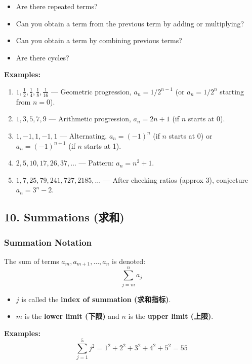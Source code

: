 \documentclass[10pt,a4paper,openany]{ctexbook}
\theoremstyle{definition}
\theoremstyle{remark}
\begin{document}
\begin{itemize}
\item Are there repeated terms?
\item Can you obtain a term from the previous term by adding or multiplying?
\item Can you obtain a term by combining previous terms?
\item Are there cycles?

\end{itemize}

\textbf{Examples:}
\begin{enumerate}
\item $1, \frac{1}{2}, \frac{1}{4}, \frac{1}{8}, \frac{1}{16}$ — Geometric progression, $a_n = 1/2^{n-1}$ (or $a_n = 1/2^n$ starting from $n=0$).
\item $1, 3, 5, 7, 9$ — Arithmetic progression, $a_n = 2n + 1$ (if $n$ starts at 0).
\item $1, -1, 1, -1, 1$ — Alternating, $a_n = (-1)^n$ (if $n$ starts at 0) or $a_n = (-1)^{n+1}$ (if $n$ starts at 1).
\item $2, 5, 10, 17, 26, 37, \dots$ — Pattern: $a_n = n^2 + 1$.
\item $1, 7, 25, 79, 241, 727, 2185, \dots$ — After checking ratios (approx 3), conjecture $a_n = 3^n - 2$.

\end{enumerate}

\vspace{-2pt}

\subsection{10. Summations (求和)}

\subsubsection{Summation Notation}

The sum of terms $a_m, a_{m+1}, \dots, a_n$ is denoted:
\[
\sum_{j=m}^{n} a_j
\]

\begin{itemize}
\item $j$ is called the \textbf{index of summation (求和指标)}.
\item $m$ is the \textbf{lower limit (下限)} and $n$ is the \textbf{upper limit (上限)}.

\end{itemize}

\textbf{Examples:}
\[
\sum_{j=1}^{5} j^2 = 1^2 + 2^2 + 3^2 + 4^2 + 5^2 = 55
\]
\end{document}

